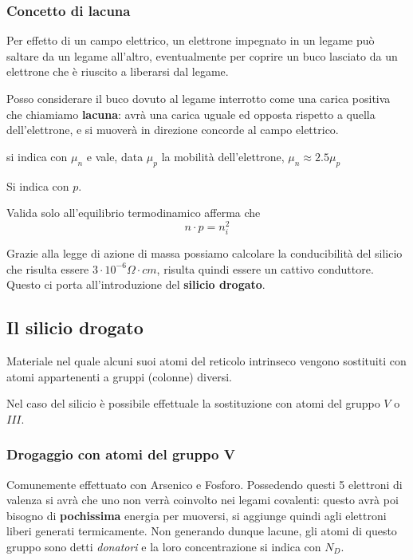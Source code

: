 \documentclass[11pt,a4paper,]{article}
\begin{document}
\subsubsection{Concetto di lacuna}
Per effetto di un campo elettrico, un elettrone impegnato in un legame può saltare da un legame all'altro, eventualmente per coprire un buco lasciato da un elettrone che è riuscito a liberarsi dal legame.
\begin{definizione}
    [Lacuna]
    Posso considerare il buco dovuto al legame interrotto come una carica positiva che chiamiamo \textbf{lacuna}: avrà una carica uguale ed opposta rispetto a quella dell'elettrone, e si muoverà in direzione concorde al campo elettrico.
    \begin{nota}
        si indica con $\mu_n$ e vale, data $\mu_p$ la mobilità dell'elettrone, $\mu_n \approx 2.5 \mu_p$
    \end{nota}
\end{definizione}
\begin{definizione}
    Si indica con $p$.
\end{definizione}
\begin{definizione}
    Valida solo all'equilibrio termodinamico afferma che
    \[
    n\cdot p = n_i^2
    \]
\end{definizione}
Grazie alla legge di azione di massa possiamo calcolare la conducibilità del silicio che risulta essere $3\cdot 10^{-6}\Omega\cdot cm$, risulta quindi essere un cattivo conduttore.
Questo ci porta all'introduzione del \textbf{silicio drogato}.
\subsection{Il silicio drogato}
\begin{definizione}
    Materiale nel quale alcuni suoi atomi del reticolo intrinseco vengono sostituiti con atomi appartenenti a gruppi (colonne) diversi.
    \begin{nota}
        Nel caso del silicio è possibile effettuale la sostituzione con atomi del gruppo $V$ o $III$.
    \end{nota}
\end{definizione}
\subsubsection{Drogaggio con atomi del gruppo V}
Comunemente effettuato con Arsenico e Fosforo. 
Possedendo questi 5 elettroni di valenza si avrà che uno non verrà coinvolto nei legami covalenti: questo avrà poi bisogno di \textbf{pochissima} energia per muoversi, si aggiunge quindi agli elettroni liberi generati termicamente.
Non generando dunque lacune, gli atomi di questo gruppo sono detti \textit{donatori} e la loro concentrazione si indica con $N_D$.
\end{document}
